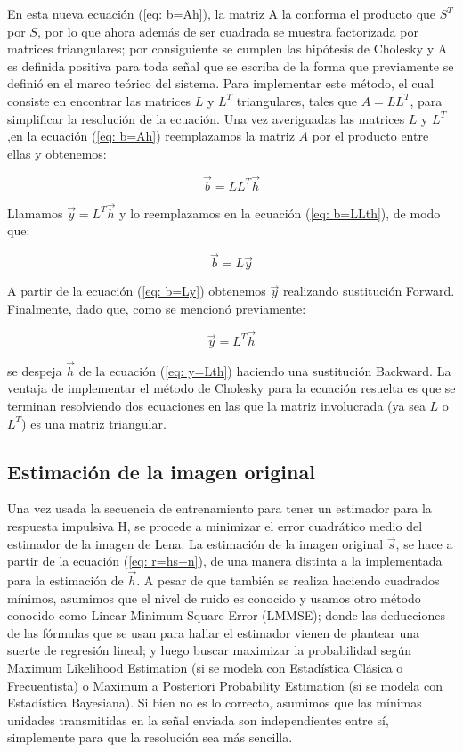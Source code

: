 En esta nueva ecuaci\'on (\ref{eq: b=Ah}), la matriz A la conforma el producto que $S^T$ por $S$, por lo que ahora además de ser cuadrada se muestra factorizada por matrices triangulares; por consiguiente se cumplen las hipótesis de Cholesky y A es definida positiva para toda señal que se escriba de la forma que previamente se definió en el marco teórico del sistema. Para implementar este m\'etodo, el cual consiste en encontrar las matrices $L$ y $L^T$ triangulares, tales que $A = L L^T$, para simplificar la resoluci\'on de la ecuaci\'on. Una vez averiguadas las matrices  $L$ y $L^T$,en la ecuaci\'on (\ref{eq: b=Ah}) reemplazamos la matriz $A$ por el producto entre ellas y obtenemos:

\begin{equation} 
\vec{b} = L L^T \vec{h} 
\label{eq: b=LLth}
\end{equation} 

Llamamos $\vec{y} = L^T \vec{h}$ y lo reemplazamos en la ecuaci\'on (\ref{eq: b=LLth}), de modo que:

\begin{equation} 
\vec{b} = L \vec{y}
\label{eq: b=Ly}
\end{equation} 

A partir de la ecuaci\'on (\ref{eq: b=Ly}) obtenemos $ \vec{y}$ realizando sustituci\'on Forward. Finalmente, dado que, como se mencion\'o previamente:

 \begin{equation} 
\vec{y} = L^T \vec{h} 
\label{eq: y=Lth}
\end{equation}

se despeja $\vec{h}$ de la ecuaci\'on (\ref{eq: y=Lth}) haciendo una sustituci\'on Backward. La ventaja de implementar el m\'etodo de Cholesky para la ecuaci\'on resuelta es que se terminan resolviendo dos ecuaciones en las que la matriz involucrada (ya sea $L$ o $L^T$) es una matriz triangular.

\subsection{Estimaci\'on de la imagen original}
Una vez usada la secuencia de entrenamiento para tener un estimador para la respuesta impulsiva H, se procede a minimizar el error cuadrático medio del estimador de la imagen de Lena. La estimaci\'on de la imagen original $\vec{s}$, se hace a partir de la ecuaci\'on (\ref{eq: r=hs+n}), de una manera distinta a la implementada para la estimaci\'on de  $\vec{h}$. A pesar de que tambi\'en se realiza haciendo cuadrados m\'inimos, asumimos que el nivel de ruido es conocido y usamos otro m\'etodo  conocido como Linear Minimum Square Error (LMMSE); donde las deducciones de las f\'ormulas que se usan para hallar el estimador vienen de plantear una suerte de regresi\'on lineal; y luego buscar maximizar la probabilidad seg\'un Maximum Likelihood Estimation (si se modela con Estad\'istica Cl\'asica o Frecuentista) o Maximum a Posteriori Probability Estimation (si se modela con Estad\'istica Bayesiana).  Si bien no es lo correcto, asumimos que las m\'inimas unidades transmitidas en la se\~nal enviada son independientes entre s\'i, simplemente para que la resoluci\'on sea m\'as sencilla. 

